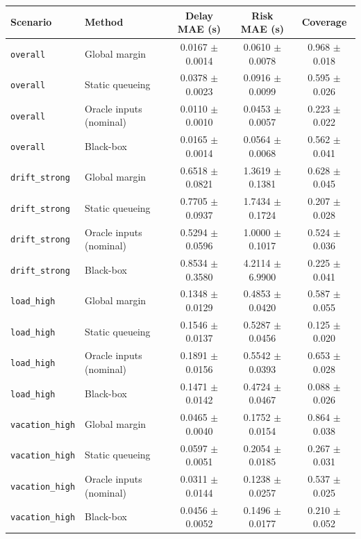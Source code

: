 \begin{tabular}{llccc}
\hline
Scenario & Method & Delay MAE (s) & Risk MAE (s) & Coverage \\
\hline
\texttt{overall} & Global margin & 0.0167 $\pm$ 0.0014 & 0.0610 $\pm$ 0.0078 & 0.968 $\pm$ 0.018 \\
\texttt{overall} & Static queueing & 0.0378 $\pm$ 0.0023 & 0.0916 $\pm$ 0.0099 & 0.595 $\pm$ 0.026 \\
\texttt{overall} & Oracle inputs (nominal) & 0.0110 $\pm$ 0.0010 & 0.0453 $\pm$ 0.0057 & 0.223 $\pm$ 0.022 \\
\texttt{overall} & Black-box & 0.0165 $\pm$ 0.0014 & 0.0564 $\pm$ 0.0068 & 0.562 $\pm$ 0.041 \\
\hline
\texttt{drift\_strong} & Global margin & 0.6518 $\pm$ 0.0821 & 1.3619 $\pm$ 0.1381 & 0.628 $\pm$ 0.045 \\
\texttt{drift\_strong} & Static queueing & 0.7705 $\pm$ 0.0937 & 1.7434 $\pm$ 0.1724 & 0.207 $\pm$ 0.028 \\
\texttt{drift\_strong} & Oracle inputs (nominal) & 0.5294 $\pm$ 0.0596 & 1.0000 $\pm$ 0.1017 & 0.524 $\pm$ 0.036 \\
\texttt{drift\_strong} & Black-box & 0.8534 $\pm$ 0.3580 & 4.2114 $\pm$ 6.9900 & 0.225 $\pm$ 0.041 \\
\hline
\texttt{load\_high} & Global margin & 0.1348 $\pm$ 0.0129 & 0.4853 $\pm$ 0.0420 & 0.587 $\pm$ 0.055 \\
\texttt{load\_high} & Static queueing & 0.1546 $\pm$ 0.0137 & 0.5287 $\pm$ 0.0456 & 0.125 $\pm$ 0.020 \\
\texttt{load\_high} & Oracle inputs (nominal) & 0.1891 $\pm$ 0.0156 & 0.5542 $\pm$ 0.0393 & 0.653 $\pm$ 0.028 \\
\texttt{load\_high} & Black-box & 0.1471 $\pm$ 0.0142 & 0.4724 $\pm$ 0.0467 & 0.088 $\pm$ 0.026 \\
\hline
\texttt{vacation\_high} & Global margin & 0.0465 $\pm$ 0.0040 & 0.1752 $\pm$ 0.0154 & 0.864 $\pm$ 0.038 \\
\texttt{vacation\_high} & Static queueing & 0.0597 $\pm$ 0.0051 & 0.2054 $\pm$ 0.0185 & 0.267 $\pm$ 0.031 \\
\texttt{vacation\_high} & Oracle inputs (nominal) & 0.0311 $\pm$ 0.0144 & 0.1238 $\pm$ 0.0257 & 0.537 $\pm$ 0.025 \\
\texttt{vacation\_high} & Black-box & 0.0456 $\pm$ 0.0052 & 0.1496 $\pm$ 0.0177 & 0.210 $\pm$ 0.052 \\
\hline
\end{tabular}
